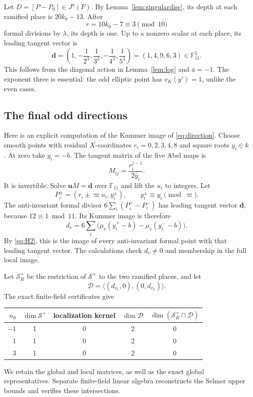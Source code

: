 \documentclass[11pt,reqno]{amsart}
\newcommand{\F}{\mathbb F}\newcommand{\OO}{\mathcal O}
\theoremstyle{definition}\newtheorem{definition}[theorem]{Definition}
\theoremstyle{remark}\newtheorem{remark}[theorem]{Remark}
\numberwithin{equation}{section}
\begin{document}
Let \(D=[P-P_0]\in J^\eta(F)\). By
Lemma~\ref{lem:singulardisc}, its depth at each ramified place is
\(20k_0-13\). After
\begin{equation}\label{eq:divisions}
 r=10k_0-7\equiv3\pmod{10}
\end{equation}
formal divisions by \(\lambda\), its depth is one. Up to a nonzero
scalar at each place, its leading tangent vector is
\begin{equation}\label{eq:direction}
 \mathbf d=
 \left(1,-\frac1{2^3},\frac1{3^3},-\frac1{4^3},\frac1{5^3}\right)
 =(1,4,9,6,3)\in\F_{11}^5.
\end{equation}
This follows from the diagonal action in Lemma~\ref{lem:log} and
\(\bar a=-1\). The exponent three is essential: the odd elliptic
point has \(v_K(y')=1\), unlike the even cases.

\subsection{The final odd directions}
Here is an explicit computation of the Kummer image of
\eqref{eq:direction}. Choose smooth points with residual
\(X\)-coordinates \(r_i=0,2,3,4,8\) and square roots \(y_i\in k\).
At zero take \(y_i=-b\). The tangent matrix of the five Abel maps is
\[
 M_{ij}=\frac{r_i^{j-1}}{2\bar y_i}.
\]
It is invertible. Solve \(\mathbf uM=\mathbf d\) over \(\F_{11}\)
and lift the \(u_i\) to integers. Let
\[
 P_i^\pm=(r_i\pm\varpi u_i,y_i^\pm),
 \qquad y_i^\pm\equiv y_i\pmod\varpi.
\]
The anti-invariant formal divisor
\(6\sum_i(P_i^+-P_i^-)\) has leading tangent vector \(\mathbf d\),
because \(12\equiv1\bmod11\). Its Kummer image is therefore
\begin{equation}\label{eq:muformula}
 d_v=6\sum_i\bigl(\mu_v(y_i^+-b)-\mu_v(y_i^--b)\bigr).
\end{equation}
By \eqref{eq:H2}, this is the image of every anti-invariant formal
point with that leading tangent vector. The calculations check
\(d_v\ne0\) and membership in the full local image.

Let \(\mathcal S_R^+\) be the restriction of \(\mathcal S^+\) to the
two ramified places, and let
\[
 \mathcal D=\langle(d_{v_1},0),(0,d_{v_2})\rangle.
\]
The exact finite-field certificates give
\begin{center}\begin{tabular}{rcccc}\toprule
\(n_0\)&\(\dim\mathcal S^+\)&localization kernel&\(\dim\mathcal D\)&
\(\dim(\mathcal S_R^+\cap\mathcal D)\)\\\midrule
\(-1\)&1&0&2&0\\
\(1\)&1&0&2&0\\
\(3\)&1&0&2&0\\\bottomrule
\end{tabular}\end{center}
We retain the global and local matrices, as well as the exact
global representatives. Separate finite-field linear algebra
reconstructs the Selmer upper bounds and verifies these intersections.
\end{document}
